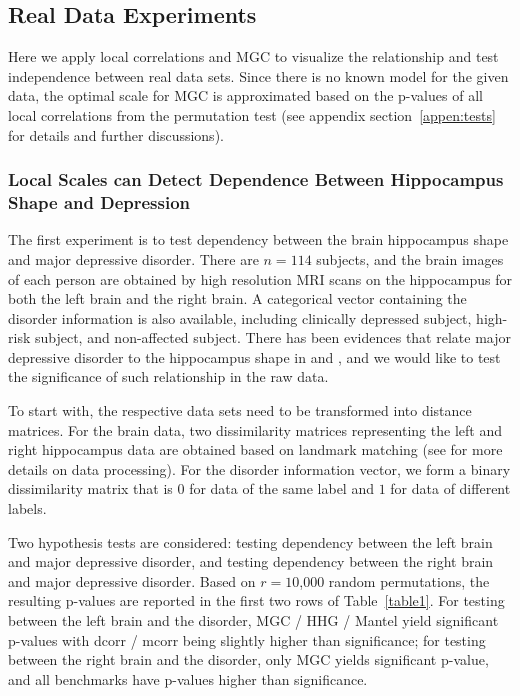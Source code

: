 \documentclass[11pt]{article}
\begin{document}
\subsection{Real Data Experiments}

\label{numer3}
Here we apply local correlations and MGC to visualize the relationship and test independence between real data sets. Since there is no known model for the given data, the optimal scale for MGC is approximated based on the p-values of all local correlations from the permutation test (see appendix section~\ref{appen:tests} for details and further discussions). 

\subsubsection{Local Scales can Detect Dependence Between Hippocampus Shape and Depression}

The first experiment is to test dependency between the brain hippocampus shape and major depressive disorder. There are $n=114$ subjects, and the brain images of each person are obtained by high resolution MRI scans on the hippocampus for both the left brain and the right brain. A categorical vector containing the disorder information is also available, including clinically depressed subject, high-risk subject, and non-affected subject. There has been evidences that relate major depressive disorder to the hippocampus shape in \cite{ParkEtAl2011} and \cite{PosenerEtAl2003}, and we would like to test the significance of such relationship in the raw data. 

To start with, the respective data sets need to be transformed into distance matrices. For the brain data, two dissimilarity matrices representing the left and right hippocampus data are obtained based on landmark matching (see \cite{ParkEtAl2011} for more details on data processing). For the disorder information vector,
we form a binary dissimilarity matrix that is $0$ for data of the same label and $1$ for data of different labels.

Two hypothesis tests are considered: testing dependency between the left brain and major depressive disorder, and testing dependency between the right brain and major depressive disorder. Based on $r=10$,$000$ random permutations, the resulting p-values are reported in the first two rows of Table~\ref{table1}. For testing between the left brain and the disorder, MGC / HHG / Mantel yield significant p-values with dcorr / mcorr being slightly higher than significance; for testing between the right brain and the disorder, only MGC yields significant p-value, and all benchmarks have p-values higher than significance. 
\end{document}
